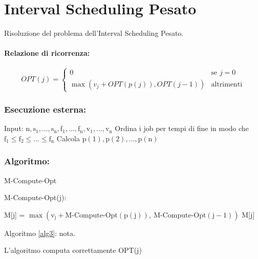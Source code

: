 \section{Interval Scheduling Pesato}
Risoluzione del problema dell'Interval Scheduling Pesato.

\paragraph{Relazione di ricorrenza:}

$$\mathit{OPT}(j) =
\begin{cases}
    0 & \text{se $j = 0$ }\\
    \max(v_j + \mathit{OPT}(p(j)), \mathit{OPT}(j-1)) & \text{altrimenti}
\end{cases} $$

\subsubsection*{Esecuzione esterna:}

\begin{algorithmic}[1]
\STATE Input: $\mathrm{n, s_1, \dots, s_n, f_1, \dots, f_n, v_1, \dots, v_n}$
\STATE Ordina i job per tempi di fine in modo che $\mathrm{f_1 \le f_2 \le \dots \le f_n}$
\STATE Calcola $\mathrm{p(1), p(2), \dots, p(n)}$
     
\ENDFOR
\end{algorithmic}

\subsubsection*{Algoritmo:}

\begin{algorithm}[H]
\caption{M-Compute-Opt}
\label{alg3}
\begin{algorithmic}[1]
\STATE M-Compute-Opt(j):
\begin{ALC@g}
\ENDIF
{}
\STATE M[j] = $\mathrm{\max(v_j + \text{M-Compute-Opt}(p(j)),\
\text{M-Compute-Opt}(j - 1))}$
\ENDIF
\RETURN M[j]
\end{ALC@g}
\end{algorithmic}
\end{algorithm}

Algoritmo \ref{alg3}:
nota\footnotemark{}.\\

\begin{theorem}
\label{the1}
L'algoritmo computa correttamente OPT(j)
\end{theorem}

